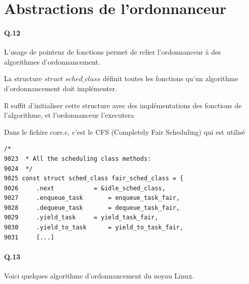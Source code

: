 \documentclass[10pt]{article}
\begin{document}
\section{Abstractions de l'ordonnanceur}
 \paragraph{Q.12}
 L'usage de pointeur de fonctions permet de relier l'ordonnanceur à des algorithmes d'ordonnancement.
 
 La structure $struct$ $sched\_class$ définit toutes les fonctions qu'un algorithme d'ordonnancement doit implémenter.
 
 Il suffit d'initialiser cette structure avec des implémentations des fonctions de l'algorithme, et l'ordonnanceur l'executera

 Dans le fichire core.c, c'est le CFS (Completely Fair Scheduling) qui est utilisé

\lstset{language=C}
\begin{lstlisting}[frame=single]
      /*
9023  * All the scheduling class methods:
9024  */ 
9025 const struct sched_class fair_sched_class = {
9026     .next           = &idle_sched_class,
9027     .enqueue_task       = enqueue_task_fair,
9028     .dequeue_task       = dequeue_task_fair,
9029     .yield_task     = yield_task_fair,
9030     .yield_to_task      = yield_to_task_fair,
9031     [...] 
\end{lstlisting}

  \paragraph{Q.13}
  Voici quelques algorithme d'ordonnancement du noyau Linux.
  
\end{document}
